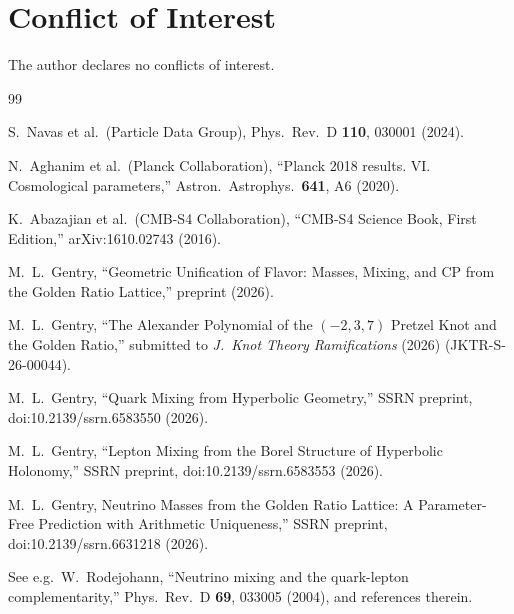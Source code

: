 \documentclass[12pt]{article}
\theoremstyle{definition}
\begin{document}
\section*{Conflict of Interest}
The author declares no conflicts of interest.

\begin{thebibliography}{99}

  S.~Navas et al.\ (Particle Data Group),
  Phys.\ Rev.\ D \textbf{110}, 030001 (2024).

  N.~Aghanim et al.\ (Planck Collaboration),
  ``Planck 2018 results. VI. Cosmological parameters,''
  Astron.\ Astrophys.\ \textbf{641}, A6 (2020).

  K.~Abazajian et al.\ (CMB-S4 Collaboration),
  ``CMB-S4 Science Book, First Edition,''
  arXiv:1610.02743 (2016).

  M.~L.~Gentry,
  ``Geometric Unification of Flavor: Masses, Mixing, and CP
  from the Golden Ratio Lattice,''
  preprint (2026).

  M.~L.~Gentry,
  ``The Alexander Polynomial of the $(-2,3,7)$ Pretzel Knot
  and the Golden Ratio,''
  submitted to \textit{J.\ Knot Theory Ramifications} (2026)
  (JKTR-S-26-00044).

  M.~L.~Gentry,
  ``Quark Mixing from Hyperbolic Geometry,''
  SSRN preprint, doi:10.2139/ssrn.6583550 (2026).

  M.~L.~Gentry,
  ``Lepton Mixing from the Borel Structure of Hyperbolic Holonomy,''
  SSRN preprint, doi:10.2139/ssrn.6583553 (2026).

  M.~L.~Gentry,
  Neutrino Masses from the Golden Ratio Lattice:
  A Parameter-Free Prediction with Arithmetic Uniqueness,''
  SSRN preprint, doi:10.2139/ssrn.6631218 (2026).

  See e.g.\ W.~Rodejohann,
  ``Neutrino mixing and the quark-lepton complementarity,''
  Phys.\ Rev.\ D \textbf{69}, 033005 (2004), and references therein.

\end{thebibliography}
\end{document}
